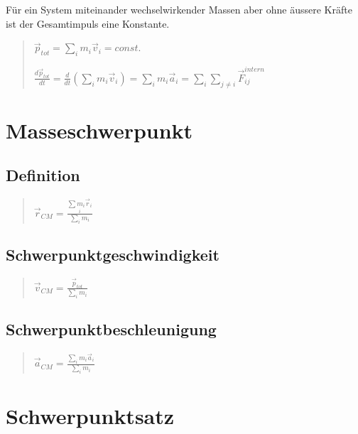 Für ein System miteinander wechselwirkender Massen aber ohne äussere
Kräfte ist der Gesamtimpuls eine Konstante.
\begin{verse}
$\vec{p}_{tot}=\underset{i}{\sum}m_{i}\vec{v}_{i}=const.$

$\frac{d\vec{p}_{tot}}{dt}=\frac{d}{dt}\left(\underset{i}{\sum}m_{i}\vec{v}_{i}\right)=\underset{i}{\sum}m_{i}\vec{a}_{i}=\underset{i}{\sum}\underset{j\neq i}{\sum}\vec{F}_{ij}^{intern}$
\end{verse}

\section*{Masseschwerpunkt}


\subsection*{Definition}
\begin{verse}
$\vec{r}_{CM}=\frac{\underset{i}{\sum m_{i}\vec{r}_{i}}}{\underset{i}{\sum}m_{i}}$
\end{verse}

\subsection*{Schwerpunktgeschwindigkeit}
\begin{verse}
$\vec{v}_{CM}=\frac{\vec{p}_{tot}}{\underset{i}{\sum}m_{i}}$
\end{verse}

\subsection*{Schwerpunktbeschleunigung}
\begin{verse}
$\vec{a}_{CM}=\frac{\underset{i}{\sum}m_{i}\vec{a}_{i}}{\underset{i}{\sum}m_{i}}$
\end{verse}

\section*{Schwerpunktsatz}


